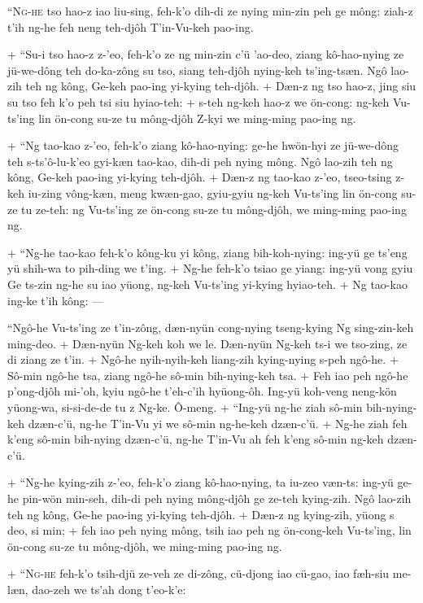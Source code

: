 \header
\lettrine{``N}{g-he} tso hao-z iao liu-sing, feh-k'o dih-di ze nying min-zin peh ge mông: ziah-z t'ih ng-he feh neng teh-djôh T'in-Vu-keh pao-ing.
\par
+	``Su-i tso hao-z z-'eo, feh-k'o ze ng min-zin c'ü 'ao-deo, ziang kô-hao-nying ze jü-we-dông teh do-ka-zông su tso, siang teh-djôh nying-keh ts'ing-tsæn. Ngô lao-zih teh ng kông, Ge-keh pao-ing yi-kying teh-djôh.
+	Dæn-z ng tso hao-z, jing siu su tso feh k'o peh tsi siu hyiao-teh:
+	s-teh ng-keh hao-z we ön-cong: ng-keh Vu-ts'ing lin ön-cong su-ze tu mông-djôh Z-kyi we ming-ming pao-ing ng.
\par
+	``Ng tao-kao z-'eo, feh-k'o ziang kô-hao-nying: ge-he hwön-hyi ze jü-we-dông teh s-ts'ô-lu-k'eo gyi-kæn tao-kao, dih-di peh nying mông. Ngô lao-zih teh ng kông, Ge-keh pao-ing yi-kying teh-djôh.
+	Dæn-z ng tao-kao z-'eo, tseo-tsing z-keh iu-zing vông-kæn, meng kwæn-gao, gyiu-gyiu ng-keh Vu-ts'ing lin ön-cong su-ze tu ze-teh: ng Vu-ts'ing ze ön-cong su-ze tu mông-djôh, we ming-ming pao-ing ng.
\par
+	``Ng-he tao-kao feh-k'o kông-ku yi kông, ziang bih-koh-nying: ing-yü ge ts'eng yü shih-wa to pih-ding we t'ing.
+	Ng-he feh-k'o tsiao ge yiang: ing-yü vong gyiu Ge ts-zin ng-he su iao yüong, ng-keh Vu-ts'ing yi-kying hyiao-teh.
+	Ng tao-kao ing-ke t'ih kông: --- \par ``Ngô-he Vu-ts'ing ze t'in-zông, dæn-nyün cong-nying tseng-kying Ng sing-zin-keh ming-deo.
+	Dæn-nyün Ng-keh koh we le. Dæn-nyün Ng-keh ts-i we tso-zing, ze di ziang ze t'in.
+	Ngô-he nyih-nyih-keh liang-zih kying-nying s-peh ngô-he.
+	Sô-min ngô-he tsa, ziang ngô-he sô-min bih-nying-keh tsa.
+	Feh iao peh ngô-he p'ong-djôh mi-'oh, kyiu ngô-he t'eh-c'ih hyüong-ôh. Ing-yü koh-veng neng-kön yüong-wa, si-si-de-de tu z Ng-ke. Ô-meng.
+	``Ing-yü ng-he ziah sô-min bih-nying-keh dzæn-c'ü, ng-he T'in-Vu yi we sô-min ng-he-keh dzæn-c'ü.
+	Ng-he ziah feh k'eng sô-min bih-nying dzæn-c'ü, ng-he T'in-Vu ah feh k'eng sô-min ng-keh dzæn-c'ü.
\par
+	``Ng-he kying-zih z-'eo, feh-k'o ziang kô-hao-nying, ta iu-zeo væn-ts: ing-yü ge-he pin-wön min-seh, dih-di peh nying mông-djôh ge ze-teh kying-zih. Ngô lao-zih teh ng kông, Ge-he pao-ing yi-kying teh-djôh.
+	Dæn-z ng kying-zih, yüong s deo, si min;
+	feh iao peh nying mông, tsih iao peh ng ön-cong-keh Vu-ts'ing, lin ön-cong su-ze tu mông-djôh, we ming-ming pao-ing ng.
\par
+	``\textsc{Ng-he} feh-k'o tsih-djü ze-veh ze di-zông, cü-djong iao cü-gao, iao fæh-siu me-læn, dao-zeh we ts'ah dong t'eo-k'e:
